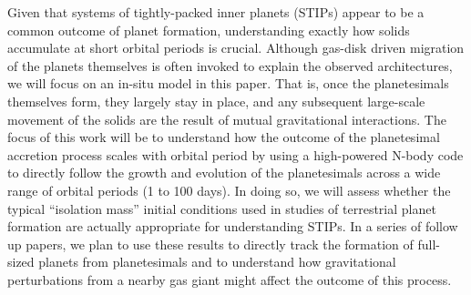 \documentclass[twocolumn]{aastex63}
\begin{document}
Given that systems of tightly-packed inner planets (STIPs) appear to
be a common outcome of planet formation, understanding exactly how
solids accumulate at short orbital periods is crucial. Although
gas-disk driven migration of the planets themselves is often invoked
to explain the observed architectures, we will focus on an in-situ
model in this paper. That is, once the planetesimals themselves form,
they largely stay in place, and any subsequent large-scale movement of
the solids are the result of mutual gravitational interactions. The
focus of this work will be to understand how the outcome of the
planetesimal accretion process scales with orbital period by using a
high-powered N-body code to directly follow the growth and evolution
of the planetesimals across a wide range of orbital periods (1 to 100
days). In doing so, we will assess whether the typical ``isolation
mass'' initial conditions used in studies of terrestrial planet formation are actually appropriate for understanding STIPs. In a series of follow up papers, we plan to use these results to directly track the formation of full-sized planets from planetesimals and to understand how gravitational perturbations from a nearby gas giant might affect the outcome of this process.


\end{document}
